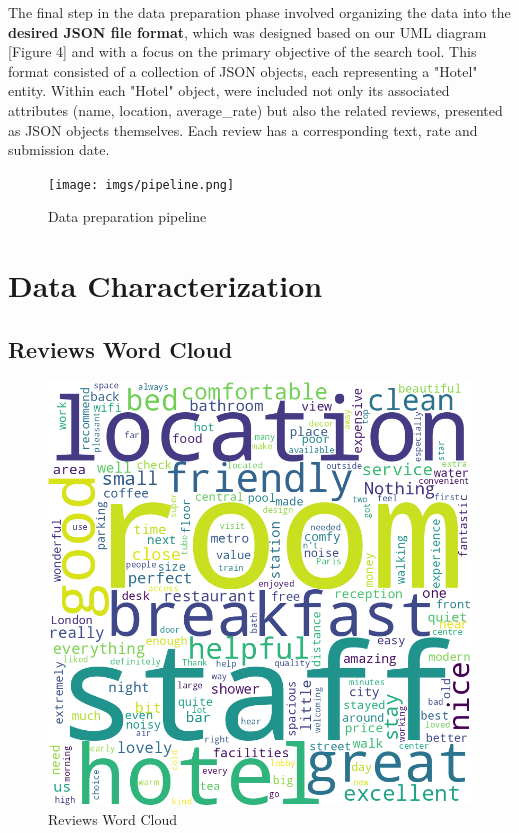 \documentclass[sigconf]{acmart}
\begin{document}
The final step in the data preparation phase involved organizing the data into the \textbf{desired JSON file format}, which was designed based on our UML diagram [Figure 4] and with a focus on the primary objective of the search tool. This format consisted of a collection of JSON objects, each representing a "Hotel" entity. Within each "Hotel" object, were included not only its associated attributes (name, location, average\_rate) but also the related reviews, presented as JSON objects themselves. Each review has a corresponding text, rate and submission date.

\begin{figure}[h]
  \centering
  \texttt{[image: imgs/pipeline.png]}
  \caption{Data preparation pipeline}
\end{figure}

\section{Data Characterization}

\subsection{Reviews Word Cloud}

\begin{figure}[h]
  \centering
  \includegraphics[width=\linewidth]{imgs/reviews_wordcloud.png}
  \caption{Reviews Word Cloud}
\end{figure}
\end{document}
